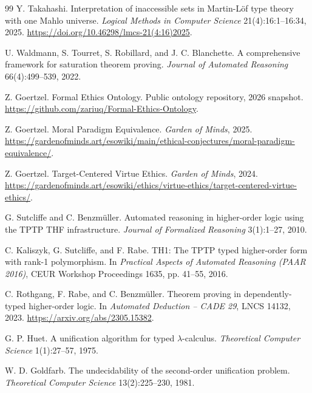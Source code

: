 \documentclass[11pt]{article}
\theoremstyle{definition}
\theoremstyle{remark}
\begin{document}
\begin{thebibliography}{99}
Y. Takahashi.
\newblock Interpretation of inaccessible sets in Martin-L\"of type theory with
  one Mahlo universe.
\newblock \emph{Logical Methods in Computer Science} 21(4):16:1--16:34, 2025.
\newblock \url{https://doi.org/10.46298/lmcs-21(4:16)2025}.

U. Waldmann, S. Tourret, S. Robillard, and J. C. Blanchette.
\newblock A comprehensive framework for saturation theorem proving.
\newblock \emph{Journal of Automated Reasoning} 66(4):499--539, 2022.

Z. Goertzel.
\newblock Formal Ethics Ontology.
\newblock Public ontology repository, 2026 snapshot.
\newblock \url{https://github.com/zariuq/Formal-Ethics-Ontology}.

Z. Goertzel.
\newblock Moral Paradigm Equivalence.
\newblock \emph{Garden of Minds}, 2025.
\newblock \url{https://gardenofminds.art/esowiki/main/ethical-conjectures/moral-paradigm-equivalence/}.

Z. Goertzel.
\newblock Target-Centered Virtue Ethics.
\newblock \emph{Garden of Minds}, 2024.
\newblock \url{https://gardenofminds.art/esowiki/ethics/virtue-ethics/target-centered-virtue-ethics/}.

G. Sutcliffe and C. Benzm\"uller.
\newblock Automated reasoning in higher-order logic using the TPTP THF
  infrastructure.
\newblock \emph{Journal of Formalized Reasoning} 3(1):1--27, 2010.

C. Kaliszyk, G. Sutcliffe, and F. Rabe.
\newblock TH1: The TPTP typed higher-order form with rank-1 polymorphism.
\newblock In \emph{Practical Aspects of Automated Reasoning (PAAR 2016)},
  CEUR Workshop Proceedings 1635, pp. 41--55, 2016.

C. Rothgang, F. Rabe, and C. Benzm\"uller.
\newblock Theorem proving in dependently-typed higher-order logic.
\newblock In \emph{Automated Deduction -- CADE 29}, LNCS 14132, 2023.
\newblock \url{https://arxiv.org/abs/2305.15382}.

G. P. Huet.
\newblock A unification algorithm for typed $\lambda$-calculus.
\newblock \emph{Theoretical Computer Science} 1(1):27--57, 1975.

W. D. Goldfarb.
\newblock The undecidability of the second-order unification problem.
\newblock \emph{Theoretical Computer Science} 13(2):225--230, 1981.


\end{thebibliography}
\end{document}
